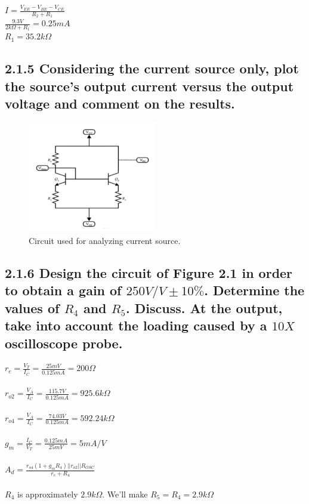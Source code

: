 \documentclass[12pt]{article}
\begin{document}
$I = \frac{V_{EE} - V_{BE} - V_{CE}}{R_2 + R_1}$ \\

$\frac{9.3V}{2k\Omega + R_1} = 0.25mA$ \\

$R_1 = 35.2k\Omega$


\subsection*{2.1.5 Considering the current source only, plot the source’s output current versus the output voltage and comment on the results.}

\begin{figure}[H]
\centering
\includegraphics[width=0.5\textwidth]{current_source.PNG}
\caption{\label{fig:current-source} Circuit used for analyzing current source.}
\end{figure}

\subsection*{2.1.6 Design the circuit of Figure 2.1 in order to obtain a gain of $250V/V ±10\%$. Determine the values of $R_4$ and $R_5$. Discuss. At the output, take into account the loading caused by a $10X$ oscilloscope probe.}

$r_e = \frac{V_T}{I_C} = \frac{25mV}{0.125mA} = 200\Omega$ \\
\\$r_{o2} = \frac{V_A}{I_C} = \frac{115.7V}{0.125mA} = 925.6k\Omega$\\
\\$r_{o4} = \frac{V_A}{I_C} = \frac{74.03V}{0.125mA} = 592.24k\Omega$\\
\\$g_m = \frac{I_C}{V_T} = \frac{0.125mA}{25mV} = 5mA/V$\\
\\$A_d = \frac{r_{o4}(1+g_mR_4)||r_{o2}||R_{OSC}}{r_e + R_4}$\\
\\$R_4$ is approximately $2.9k\Omega$. We'll make $R_5 = R_4 = 2.9k\Omega$\\
\end{document}
